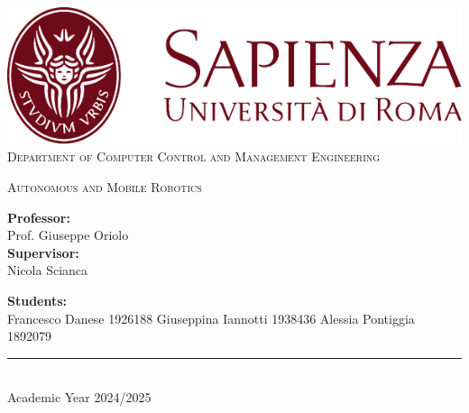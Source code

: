 \begin{titlepage}
	\centering
    \vspace*{0.5 cm}
    \includegraphics[scale = 0.75]{figures/SapienzaLogo.pdf}\\[1.0 cm]	%

    \vspace*{-0.4cm}
    \textsc{\large Department of Computer Control and Management Engineering}\\[2.0 cm]	%
    \vspace*{1cm}

    { \fontsize{20.74pt}{18.5pt}\selectfont\bfseries \thetitle \par } %

    \vspace*{0.25cm}
    \textsc{\Large Autonomous and Mobile Robotics}\\[0.5 cm] %

    \vspace*{2.6cm}
	\begin{minipage}[t]{0.45\textwidth}
		\begin{flushleft} \large
			\textbf{Professor:}\\
			Prof. Giuseppe Oriolo\\
			\textbf{Supervisor:}\\
			Nicola Scianca
		\end{flushleft}
	\end{minipage}
	\hspace{1cm}
	\begin{minipage}[t]{0.45\textwidth}
		\begin{flushleft} \large
			\textbf{Students:}\\
			Francesco Danese 1926188
			Giuseppina Iannotti 1938436
			Alessia Pontiggia 1892079
		\end{flushleft}
	\end{minipage}

    \vspace{3cm}

    \rule{\linewidth}{0.2 mm} \\[0.3 cm]
    \vspace*{-0.2cm}
    Academic Year 2024/2025
\end{titlepage}

